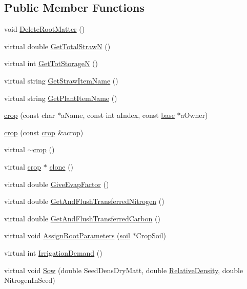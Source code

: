 \subsection*{Public Member Functions}
\begin{DoxyCompactItemize}
\item 
void \hyperlink{classcrop_a0e65f8e17a7a00d9c4273a12d62c46d6}{DeleteRootMatter} ()
\item 
virtual double \hyperlink{classcrop_aad20ce4175c73ff9e9e41cdde0ff6070}{GetTotalStrawN} ()
\item 
virtual int \hyperlink{classcrop_a9e1e91e9a97bcd8d0867427ec54334d4}{GetTotStorageN} ()
\item 
virtual string \hyperlink{classcrop_ad469acc2d28e07fc7356793c8cf7eabb}{GetStrawItemName} ()
\item 
virtual string \hyperlink{classcrop_ab34034b35e26b316a1649770f3de6374}{GetPlantItemName} ()
\item 
\hyperlink{classcrop_a852f1319f017379280a1604a1bbddf0e}{crop} (const char $\ast$aName, const int aIndex, const \hyperlink{classbase}{base} $\ast$aOwner)
\item 
\hyperlink{classcrop_ae21f526e78ac3bcfe9f71a58d785b7bf}{crop} (const \hyperlink{classcrop}{crop} \&acrop)
\item 
virtual \hyperlink{classcrop_a87d279e2be25081212cf17871c177388}{$\sim$crop} ()
\item 
virtual \hyperlink{classcrop}{crop} $\ast$ \hyperlink{classcrop_a59eff636f3b438badd4b06811c1fc595}{clone} ()
\item 
virtual double \hyperlink{classcrop_aac8ad06adb13f585cfde7cd3f2661618}{GiveEvapFactor} ()
\item 
virtual double \hyperlink{classcrop_a646a4f85f4fd25b4cbfc37cb46aae4ab}{GetAndFlushTransferredNitrogen} ()
\item 
virtual double \hyperlink{classcrop_a1eb45dfdaae692240eac0102df381742}{GetAndFlushTransferredCarbon} ()
\item 
virtual void \hyperlink{classcrop_a8c2110cc2b12fed93031787f6c557fcb}{AssignRootParameters} (\hyperlink{classsoil}{soil} $\ast$CropSoil)
\item 
virtual int \hyperlink{classcrop_a2094690538653a0a491682b12ae2da3e}{IrrigationDemand} ()
\item 
virtual void \hyperlink{classcrop_a2c5df235a96a1daa3ab122baf17518d4}{Sow} (double SeedDensDryMatt, double \hyperlink{classcrop_aa4666fdd11920e05003bfeefc5518ddf}{RelativeDensity}, double NitrogenInSeed)
\item 

\end{DoxyCompactItemize}
